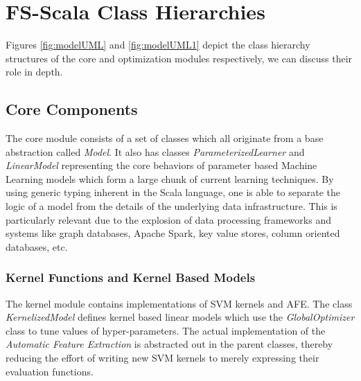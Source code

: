 \chapter{FS-Scala Class Hierarchies}
\label{app:A}
Figures \ref{fig:modelUML} and \ref{fig:modelUML1} depict the class hierarchy structures of the core and optimization modules respectively, we can discuss their role in depth.

\section{Core Components}
The core module consists of a set of classes which all originate from a base abstraction called \textit{Model}. It also has classes \textit{ParameterizedLearner} and \textit{LinearModel} representing the core behaviors of parameter based Machine Learning models which form a large chunk of current learning techniques. By using generic typing inherent in the Scala language, one is able to separate the logic of a model from the details of the underlying data infrastructure. This is particularly relevant due to the explosion of data processing frameworks and systems like graph databases, Apache Spark, key value stores, column oriented databases, etc.

\subsection*{Kernel Functions and Kernel Based Models}
The kernel module contains implementations of SVM kernels and AFE. The class \textit{KernelizedModel} defines kernel based linear models which use the \textit{GlobalOptimizer} class to tune values of hyper-parameters. The actual implementation of the \textit{Automatic Feature Extraction} is abstracted out in the parent classes, thereby reducing the effort of writing new SVM kernels to merely expressing their evaluation functions.


